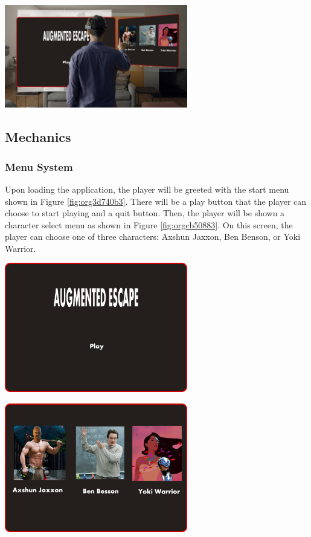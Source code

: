 \documentclass[12pt]{article}
\begin{document}
\begin{center}
\includegraphics[width=8cm]{./img/main-menu-1.jpg}
\end{center}

\subsection{Mechanics}
\label{sec:org332f5b8}
\subsubsection{Menu System}
\label{sec:org7d806ed}
Upon loading the application, the player will be greeted with the start menu shown in Figure \ref{fig:org3d740b3}. There will be a play button that the player can choose to start playing and a quit button. Then, the player will be shown a character select menu as shown in Figure \ref{fig:orgcb50883}. On this screen, the player can choose one of three characters: Axshun Jaxxon, Ben Benson, or Yoki Warrior.

\begin{center}
\includegraphics[width=8cm]{./img/start-screen.png}
\end{center}

\begin{center}
\includegraphics[width=8cm]{./img/character-select.png}
\end{center}
\end{document}
